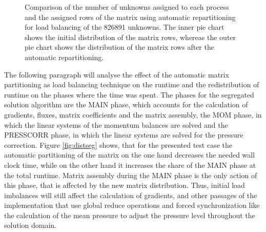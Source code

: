 \begin{figure}[h!]
\begin{minipage}{0.45\textwidth}
\end{minipage}
\caption{Comparison of the number of unknowns assigned to each process and the assigned rows of the matrix using automatic repartitioning for load balancing of the 826891 unknowns. The inner pie chart shows the initial distribution of the matrix rows, whereas the outer pie chart shows the distribution of the matrix rows after the automatic repartitioning.}
\label{fig:distcpld}
\end{figure}

The following paragraph will analyse the effect of the automatic matrix partitioning as load balancing technique on the runtime and the redistribution of runtime on the phases where the time was spent. The phases for the segregated solution algorithm are the MAIN phase, which accounts for the calculation of gradients, fluxes, matrix coefficients and the matrix assembly, the MOM phase, in which the linear systems of the momentum balances are solved and the PRESSCORR phase, in which the linear systems are solved for the pressure correction. Figure \ref{fig:distseg} shows, that for the presented test case the automatic partitioning of the matrix on the one hand decreases the needed wall clock time, while on the other hand it increases the share of the MAIN phase at the total runtime. Matrix assembly during the MAIN phase is the only action of this phase, that is affected by the new matrix distribution. Thus, initial load imbalances will still affect the calculation of gradients, and other passages of the implementation that use global reduce operations and forced synchronization like the calculation of the mean pressure to adjust the pressure level throughout the solution domain.

